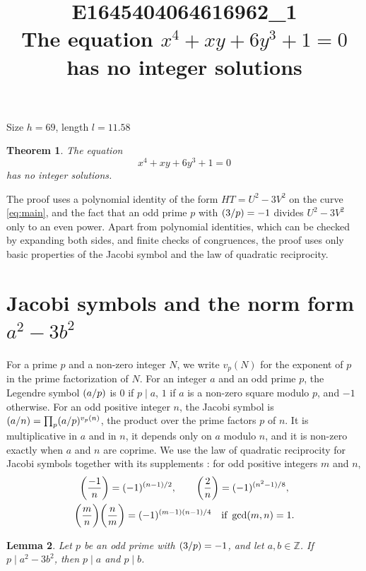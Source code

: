 \documentclass[11pt]{article}
\title{\textbf{E1645404064616962\_1}\\[4pt] {\Large The equation $x^{4}+xy+6y^{3}+1=0$ has no integer solutions}}
\author{}
\date{}
\newtheorem{theorem}{Theorem}
\newtheorem{lemma}[theorem]{Lemma}
\newcommand{\Z}{\mathbb{Z}}
\newcommand{\leg}[2]{\mathchoice{\biggl(\dfrac{#1}{#2}\biggr)}{(#1/#2)}{(#1/#2)}{(#1/#2)}}
\begin{document}
\maketitle
\vspace{-8ex}
\begin{center}
Size $h=69$, length $l=11.58$
\end{center}

\begin{theorem}\label{thm:main}
The equation
\begin{equation}\label{eq:main}
x^{4}+xy+6y^{3}+1=0
\end{equation}
has no integer solutions.
\end{theorem}

The proof uses a polynomial identity of the form $HT=U^2-3V^2$ on the curve \eqref{eq:main}, and the fact that an odd prime $p$ with $\leg{3}{p}=-1$ divides $U^2-3V^2$ only to an even power. Apart from polynomial identities, which can be checked by expanding both sides, and finite checks of congruences, the proof uses only basic properties of the Jacobi symbol and the law of quadratic reciprocity.

\section{\texorpdfstring{Jacobi symbols and the norm form $a^2-3b^2$}{Jacobi symbols and the norm form}}

For a prime $p$ and a non-zero integer $N$, we write $v_p(N)$ for the exponent of $p$ in the prime factorization of $N$. For an integer $a$ and an odd prime $p$, the Legendre symbol $\leg{a}{p}$ is $0$ if $p\mid a$, $1$ if $a$ is a non-zero square modulo $p$, and $-1$ otherwise. For an odd positive integer $n$, the Jacobi symbol is $\leg{a}{n}=\prod_p\leg{a}{p}^{v_p(n)}$, the product over the prime factors $p$ of $n$. It is multiplicative in $a$ and in $n$, it depends only on $a$ modulo $n$, and it is non-zero exactly when $a$ and $n$ are coprime. We use the law of quadratic reciprocity for Jacobi symbols together with its supplements \cite[Chapter~5, \S2]{IR}: for odd positive integers $m$ and $n$,
\begin{gather*}
\leg{-1}{n}=(-1)^{(n-1)/2},\qquad\leg{2}{n}=(-1)^{(n^2-1)/8},\\
\leg{m}{n}\leg{n}{m}=(-1)^{(m-1)(n-1)/4}\quad\text{if }\gcd(m,n)=1.
\end{gather*}

\begin{lemma}\label{lem:divides}
Let $p$ be an odd prime with $\leg{3}{p}=-1$, and let $a,b\in\Z$. If $p\mid a^2-3b^2$, then $p\mid a$ and $p\mid b$.
\end{lemma}
\end{document}
